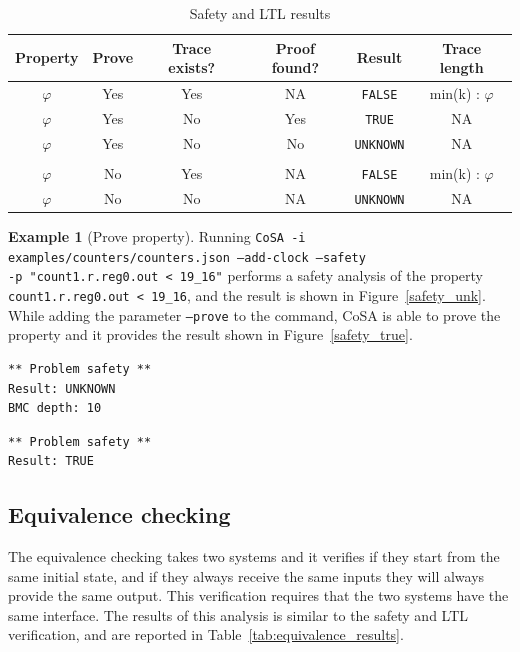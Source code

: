 \documentclass{article}
\theoremstyle{definition}
\newtheorem{example}{Example}[section]
\begin{document}
\begin{table}[h]
  \centering
\begin{tabular}{ c c c c | c c }
  Property & Prove & Trace exists? & Proof found? & Result & Trace length \\ \hline
  $\varphi$ & Yes & Yes & NA & \texttt{FALSE} & min(k) : $\varphi$  \\
  $\varphi$ & Yes & No & Yes & \texttt{TRUE} & NA  \\
  $\varphi$ & Yes & No & No & \texttt{UNKNOWN} & NA  \\ \\
  $\varphi$ & No & Yes & NA & \texttt{FALSE} & min(k) : $\varphi$  \\
  $\varphi$ & No & No & NA & \texttt{UNKNOWN} & NA  \\
\end{tabular}
\caption{Safety and LTL results}
\label{tab:safety_results}
\end{table}

\begin{example}[Prove property]
  Running \texttt{CoSA -i examples/counters/counters.json --add-clock
    --safety\\ -p "count1.r.reg0.out < 19\_16"} performs a safety
  analysis of the property \texttt{count1.r.reg0.out < 19\_16}, and
  the result is shown in Figure~\ref{safety_unk}. While adding the
  parameter \texttt{--prove} to the command, CoSA is able to prove the
  property and it provides the result shown in Figure~\ref{safety_true}.

\begin{lstlisting}[frame=single,language=ets,caption=Safety example (UNKNOWN),label=safety_unk]
** Problem safety **
Result: UNKNOWN
BMC depth: 10
\end{lstlisting}

\begin{lstlisting}[frame=single,language=ets,caption=Safety example (TRUE),label=safety_true]
** Problem safety **
Result: TRUE
\end{lstlisting}

\end{example}


\subsection{Equivalence checking}

The equivalence checking takes two systems and it verifies if they
start from the same initial state, and if they always receive the same
inputs they will always provide the same output. This verification
requires that the two systems have the same interface. The results of
this analysis is similar to the safety and LTL verification, and are
reported in Table~\ref{tab:equivalence_results}.
\end{document}
